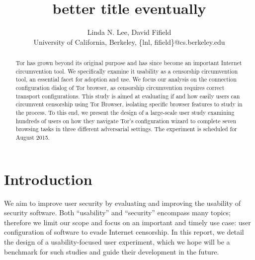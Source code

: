 \documentclass[letterpaper,twocolumn,11pt]{article}
\begin{document}
\title{better title eventually}
\author{Linda N. Lee, David Fifield\\
University of California, Berkeley, \{lnl, fifield\}@cs.berkeley.edu
}
\maketitle

\begin{abstract}
\indent \indent Tor has grown beyond its original purpose and has  since become an important 
Internet circumvention tool. We specifically examine it usability as a censorship circumvention tool, 
an essential facet for adoption and use.  We focus our analysis on the connection configuration dialog of 
Tor browser, as censorship circumvention requires correct transport configurations. 
This study is aimed at evaluating if and how easily users can circumvent censorship using Tor Browser,
isolating specific browser features to study in the process.  To this end, we present the design of
 a large-scale user study examining hundreds of users  on how they navigate Tor's configuration wizard to complete seven browsing tasks in three different adversarial settings. The experiment is scheduled for August 2015.
\end{abstract}

\section{Introduction} %

We aim to improve user security by evaluating
and improving the usability of security software.
Both ``usability'' and ``security'' encompass many topics;
therefore we limit our scope and focus on
an important and timely use case:
user configuration of software to evade Internet censorship.
In this report, we detail the design of a usability-focused user experiment,
which we hope will be a benchmark for such studies
and guide their development in the future.
\end{document}
